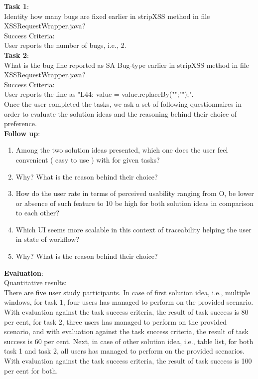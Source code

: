 \textbf{Task 1}: \\ 

Identity how many bugs are fixed earlier in stripXSS method in file XSSRequestWrapper.java? \\

Success Criteria: \\

User reports the number of bugs, i.e., 2. \\

\textbf{Task 2}: \\

What is the bug line reported as SA Bug-type earlier in stripXSS method in file XSSRequestWrapper.java? \\

Success Criteria: \\
 
User reports the line as "L44: value = value.replaceBy("";"");". \\

Once the user completed the tasks, we ask a set of following questionnaires in order to evaluate the solution ideas and the reasoning behind their choice of preference. \\

\textbf{Follow up}: \\

\begin{enumerate}
\item Among the two solution ideas presented, which one does the user feel convenient ( easy to use ) with for given tasks?
\item Why? What is the reason behind their choice?
\item How do the user rate in terms of perceived usability ranging from O, be lower or absence of such feature to 10 be high for both solution ideas in comparison to each other?
\item Which UI seems more scalable in this context of traceability helping the user in state of workflow?
\item Why? What is the reason behind their choice?
\end{enumerate}

\textbf{Evaluation}: \\

Quantitative results: \\

There are five user study participants. In case of first solution idea, i.e., multiple windows, for task 1, four users has managed to perform on the provided scenario. With evaluation against the task success criteria, the result of task success is 80 per cent, for task 2, three users has managed to perform on the provided scenario, and with evaluation against the task success criteria, the result of task success is 60 per cent. Next, in case of other solution idea, i.e., table list, for both task 1 and task 2, all users has managed to perform on the provided scenarios. With evaluation against the task success criteria, the result of task success is 100 per cent for both. \\

